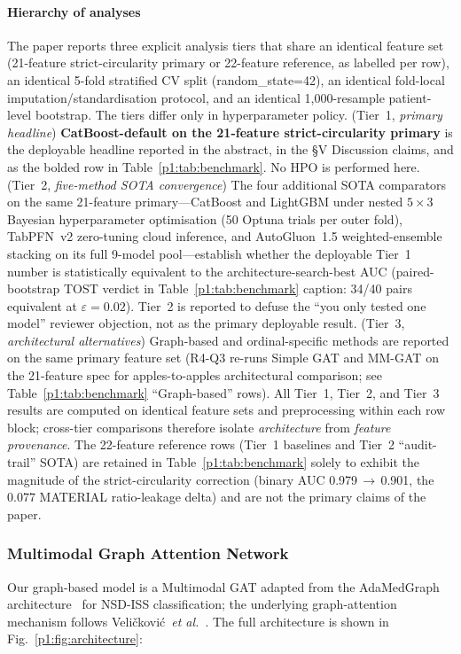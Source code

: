 \paragraph*{Hierarchy of analyses} The paper reports three explicit analysis tiers that share an identical feature set (21-feature strict-circularity primary or 22-feature reference, as labelled per row), an identical 5-fold stratified CV split (random\_state=42), an identical fold-local imputation/standardisation protocol, and an identical 1{,}000-resample patient-level bootstrap. The tiers differ only in hyperparameter policy. (Tier~1, \emph{primary headline}) \textbf{CatBoost-default on the 21-feature strict-circularity primary} is the deployable headline reported in the abstract, in the §V Discussion claims, and as the bolded row in Table~\ref{p1:tab:benchmark}. No HPO is performed here. (Tier~2, \emph{five-method SOTA convergence}) The four additional SOTA comparators on the same 21-feature primary---CatBoost and LightGBM under nested $5{\times}3$ Bayesian hyperparameter optimisation (50 Optuna trials per outer fold), TabPFN~v2 zero-tuning cloud inference, and AutoGluon~1.5 weighted-ensemble stacking on its full 9-model pool---establish whether the deployable Tier~1 number is statistically equivalent to the architecture-search-best AUC (paired-bootstrap TOST verdict in Table~\ref{p1:tab:benchmark} caption: 34/40 pairs equivalent at $\varepsilon{=}0.02$). Tier~2 is reported to defuse the ``you only tested one model'' reviewer objection, not as the primary deployable result. (Tier~3, \emph{architectural alternatives}) Graph-based and ordinal-specific methods are reported on the same primary feature set (R4-Q3 re-runs Simple GAT and MM-GAT on the 21-feature spec for apples-to-apples architectural comparison; see Table~\ref{p1:tab:benchmark} ``Graph-based'' rows). All Tier~1, Tier~2, and Tier~3 results are computed on identical feature sets and preprocessing within each row block; cross-tier comparisons therefore isolate \emph{architecture} from \emph{feature provenance}. The 22-feature reference rows (Tier~1 baselines and Tier~2 ``audit-trail'' SOTA) are retained in Table~\ref{p1:tab:benchmark} solely to exhibit the magnitude of the strict-circularity correction (binary AUC 0.979$\,\to\,$0.901, the $0.077$ MATERIAL ratio-leakage delta) and are not the primary claims of the paper.

\subsubsection{Multimodal Graph Attention Network}
Our graph-based model is a Multimodal GAT adapted from the AdaMedGraph architecture~\cite{adamedgraph} for NSD-ISS classification; the underlying graph-attention mechanism follows Veli\v{c}kovi\'{c}~\textit{et al.}~\cite{velickovic2018gat}. The full architecture is shown in Fig.~\ref{p1:fig:architecture}:

